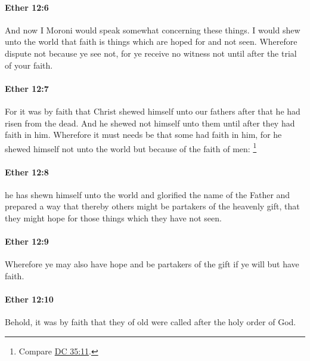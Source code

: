 		\paragraph{Ether 12:6} %
			\label{ETHER-12-6}

			And now I Moroni would speak somewhat concerning these things.
			I would shew unto the world
			that faith is things which are hoped for and not seen.
			Wherefore dispute not because ye see not,
			for ye receive no witness not until after the trial of your faith.

		\paragraph{Ether 12:7} %
			\label{ETHER-12-7}

			For it was by faith that Christ shewed himself unto our fathers
			after that he had risen from the dead.
			And he shewed not himself unto them until after they had faith in him.
			Wherefore it must needs be that some had faith in him,
			for he shewed himself not unto the world but because of the faith of men:%
				\footnote{%
					Compare \hyperref[DC35-11]{DC 35:11}.
					} 

		\paragraph{Ether 12:8} %
			\label{ETHER-12-8}

			he has shewn himself unto the world
			and glorified the name of the Father
			and prepared a way that thereby others might be partakers of the heavenly gift,
			that they might hope for those things which they have not seen.

		\paragraph{Ether 12:9} %
			\label{ETHER-12-9}

			Wherefore ye may also have hope and be partakers of the gift
			if ye will but have faith.

		\paragraph{Ether 12:10} %
			\label{ETHER-12-10}

			Behold, it was by faith
			that they of old were called after the holy order of God.


